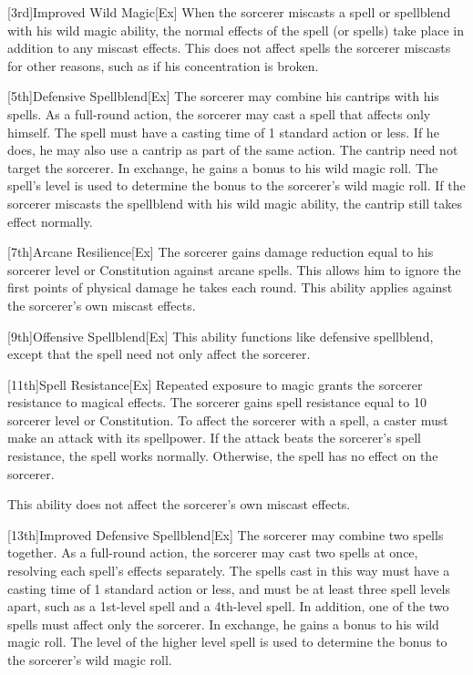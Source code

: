 [3rd]{Improved Wild Magic}[Ex]
When the sorcerer miscasts a spell or spellblend with his wild magic ability, the normal effects of the spell (or spells) take place in addition to any miscast effects.
This does not affect spells the sorcerer miscasts for other reasons, such as if his concentration is broken.

[5th]{Defensive Spellblend}[Ex]
The sorcerer may combine his cantrips with his spells.
As a full-round action, the sorcerer may cast a spell that affects only himself.
The spell must have a casting time of 1 standard action or less.
If he does, he may also use a cantrip as part of the same action.
The cantrip need not target the sorcerer.
In exchange, he gains a  bonus to his wild magic roll.
The spell's level is used to determine the bonus to the sorcerer's wild magic roll.
If the sorcerer miscasts the spellblend with his wild magic ability, the cantrip still takes effect normally.


[7th]{Arcane Resilience}[Ex]
The sorcerer gains damage reduction equal to his sorcerer level or Constitution against arcane spells.
This allows him to ignore the first points of physical damage he takes each round.
This ability applies against the sorcerer's own miscast effects.

[9th]{Offensive Spellblend}[Ex]
This ability functions like defensive spellblend, except that the spell need not only affect the sorcerer.

[11th]{Spell Resistance}[Ex]
Repeated exposure to magic grants the sorcerer resistance to magical effects.
The sorcerer gains spell resistance equal to 10 \add sorcerer level or Constitution.
To affect the sorcerer with a spell, a caster must make an attack with its spellpower.
If the attack beats the sorcerer's spell resistance, the spell works normally.
Otherwise, the spell has no effect on the sorcerer.

This ability does not affect the sorcerer's own miscast effects.

[13th]{Improved Defensive Spellblend}[Ex]
The sorcerer may combine two spells together.
As a full-round action, the sorcerer may cast two spells at once, resolving each spell's effects separately.
The spells cast in this way must have a casting time of 1 standard action or less, and must be at least three spell levels apart, such as a 1st-level spell and a 4th-level spell.
In addition, one of the two spells must affect only the sorcerer.
In exchange, he gains a  bonus to his wild magic roll.
The level of the higher level spell is used to determine the bonus to the sorcerer's wild magic roll.

